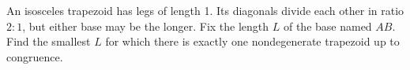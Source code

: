 An isosceles trapezoid has legs of length 1. Its diagonals divide each other in ratio $ 2:1 $, but either base may be the longer. Fix the length $ L $ of the base named $ AB $. Find the smallest $ L $ for which there is exactly one nondegenerate trapezoid up to congruence.
